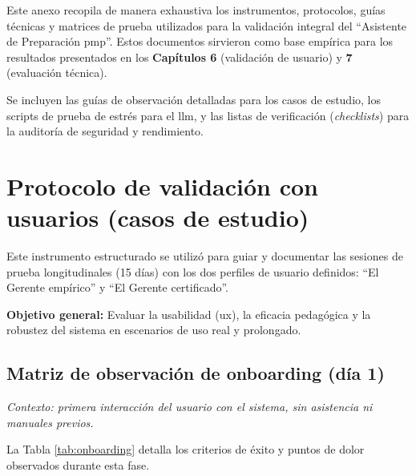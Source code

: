 Este anexo recopila de manera exhaustiva los instrumentos, protocolos, guías técnicas y matrices de prueba utilizados para la validación integral del \enquote{Asistente de Preparación \gls{pmp}}. Estos documentos sirvieron como base empírica para los resultados presentados en los \textbf{Capítulos 6} (validación de usuario) y \textbf{7} (evaluación técnica).

Se incluyen las guías de observación detalladas para los casos de estudio, los scripts de prueba de estrés para el \gls{llm}, y las listas de verificación (\textit{checklists}) para la auditoría de seguridad y rendimiento.

\section{Protocolo de validación con usuarios (casos de estudio)}

Este instrumento estructurado se utilizó para guiar y documentar las sesiones de prueba longitudinales (15 días) con los dos perfiles de usuario definidos: \enquote{El Gerente empírico} y \enquote{El Gerente certificado}.

\textbf{Objetivo general:} Evaluar la usabilidad (\gls{ux}), la eficacia pedagógica y la robustez del sistema en escenarios de uso real y prolongado.

\subsection{Matriz de observación de onboarding (día 1)}

\textit{Contexto: primera interacción del usuario con el sistema, sin asistencia ni manuales previos.}

La Tabla \ref{tab:onboarding} detalla los criterios de éxito y puntos de dolor observados durante esta fase.

